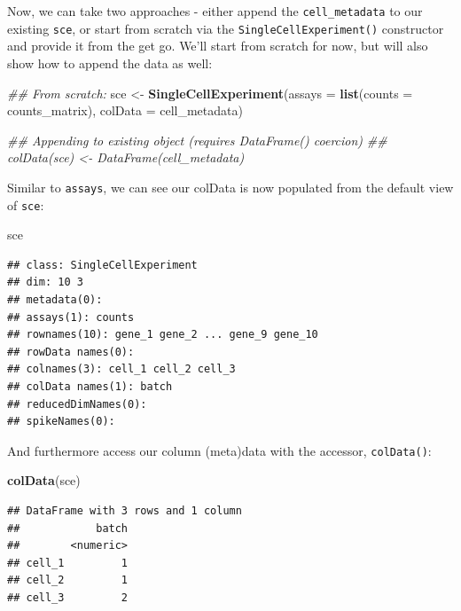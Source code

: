 \documentclass[]{book}
\newenvironment{Shaded}{\begin{snugshade}}{\end{snugshade}}
\newcommand{\CommentTok}[1]{\textcolor[rgb]{0.56,0.35,0.01}{\textit{#1}}}
\newcommand{\DataTypeTok}[1]{\textcolor[rgb]{0.13,0.29,0.53}{#1}}
\newcommand{\KeywordTok}[1]{\textcolor[rgb]{0.13,0.29,0.53}{\textbf{#1}}}
\newcommand{\NormalTok}[1]{#1}
\newcommand{\StringTok}[1]{\textcolor[rgb]{0.31,0.60,0.02}{#1}}
\begin{document}
Now, we can take two approaches - either append the \texttt{cell\_metadata} to our existing \texttt{sce}, or start from scratch via the \texttt{SingleCellExperiment()} constructor and provide it from the get go. We'll start from scratch for now, but will also show how to append the data as well:

\begin{Shaded}
\begin{Highlighting}[]
\CommentTok{## From scratch:}
\NormalTok{sce <-}\StringTok{ }\KeywordTok{SingleCellExperiment}\NormalTok{(}\DataTypeTok{assays =} \KeywordTok{list}\NormalTok{(}\DataTypeTok{counts =}\NormalTok{ counts_matrix),}
                           \DataTypeTok{colData =}\NormalTok{ cell_metadata)}

\CommentTok{## Appending to existing object (requires DataFrame() coercion)}
\CommentTok{## colData(sce) <- DataFrame(cell_metadata)}
\end{Highlighting}
\end{Shaded}

Similar to \texttt{assays}, we can see our colData is now populated from the default view of \texttt{sce}:

\begin{Shaded}
\begin{Highlighting}[]
\NormalTok{sce}
\end{Highlighting}
\end{Shaded}

\begin{verbatim}
## class: SingleCellExperiment 
## dim: 10 3 
## metadata(0):
## assays(1): counts
## rownames(10): gene_1 gene_2 ... gene_9 gene_10
## rowData names(0):
## colnames(3): cell_1 cell_2 cell_3
## colData names(1): batch
## reducedDimNames(0):
## spikeNames(0):
\end{verbatim}

And furthermore access our column (meta)data with the accessor, \texttt{colData()}:

\begin{Shaded}
\begin{Highlighting}[]
\KeywordTok{colData}\NormalTok{(sce)}
\end{Highlighting}
\end{Shaded}

\begin{verbatim}
## DataFrame with 3 rows and 1 column
##            batch
##        <numeric>
## cell_1         1
## cell_2         1
## cell_3         2
\end{verbatim}
\end{document}
